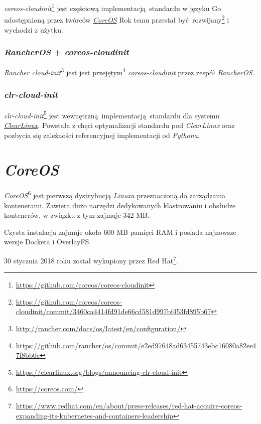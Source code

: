 \documentclass[a4paper,12pt,twoside,openany]{report}
\DeclareRobustCommand{\href}[2]{#2\footnote{\url{#1}}}
\begin{document}
\href{https://github.com/coreos/coreos-cloudinit}{\emph{coreos-cloudinit}}
jest częściową implementacją~standardu w języku Go udostępnioną przez
twórców \protect\hyperlink{coreos}{\emph{CoreOS}}
\href{https://github.com/coreos/coreos-cloudinit/commit/3460ca4414fd91de66cd581d997bf453fd895b67}{Rok
temu przestał być~rozwijany} i wychodzi z użytku.

\hypertarget{rancheros-coreos-cloudinit}{%
\subsubsection{\texorpdfstring{\emph{RancherOS} +
\emph{coreos-cloudinit}}{RancherOS + coreos-cloudinit}}\label{rancheros-coreos-cloudinit}}

\href{http://rancher.com/docs/os/latest/en/configuration/}{\emph{Rancher
cloud-init}} jest jest
\href{https://github.com/rancher/os/commit/e2ed97648ad63455743ebc16080a82ee47f8bb0c}{przejętym}
\protect\hyperlink{coreos-cloudinit}{\emph{coreos-cloudinit}} przez
zespół \protect\hyperlink{rancheros}{\emph{RancherOS}}.

\hypertarget{clr-cloud-init}{%
\subsubsection{\texorpdfstring{\emph{clr-cloud-init}}{clr-cloud-init}}\label{clr-cloud-init}}

\href{https://clearlinux.org/blogs/announcing-clr-cloud-init}{\emph{clr-cloud-init}}
jest wewnętrzną~implementacją~standardu dla systemu
\protect\hyperlink{clearlinux}{\emph{ClearLinux}}. Powstała z chęci
optymalizacji standardu pod \emph{ClearLinux} oraz pozbycia się
zależności referencyjnej implementacji od \emph{Pythona}.

\hypertarget{coreos}{%
\section{\texorpdfstring{\emph{CoreOS}}{CoreOS}}\label{coreos}}

\href{https://coreos.com/}{\emph{CoreOS}} jest pierwszą dystrybucją
\emph{Linuxa} przeznaczoną do zarządzania kontenerami. Zawiera dużo
narzędzi dedykowanych klastrowaniu i obsłudze kontenerów, w związku z
tym zajmuje 342 MB.

Czysta instalacja zajmuje około 600 MB pamięci RAM i posiada najnowsze
wersje Dockera i OverlayFS.

30 stycznia 2018 roku
\href{https://www.redhat.com/en/about/press-releases/red-hat-acquire-coreos-expanding-its-kubernetes-and-containers-leadership}{został
wykupiony przez Red Hat}.
\end{document}
